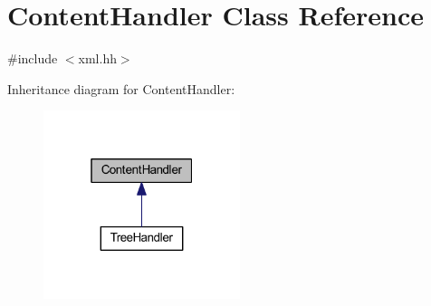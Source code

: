 \hypertarget{class_content_handler}{}\section{Content\+Handler Class Reference}
\label{class_content_handler}


{\ttfamily \#include $<$xml.\+hh$>$}



Inheritance diagram for Content\+Handler\+:
\nopagebreak
\begin{figure}[H]
\begin{center}
\leavevmode
\includegraphics[width=163pt]{class_content_handler__inherit__graph}
\end{center}
\end{figure}
